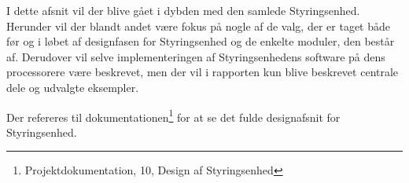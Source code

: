 
I dette afsnit vil der blive gået i dybden med den samlede Styringsenhed. Herunder vil der blandt andet være fokus på nogle af de valg, der er taget både før og i løbet af designfasen for Styringsenhed og de enkelte moduler, den består af. Derudover vil selve implementeringen af Styringsenhedens software på dens processorere være beskrevet, men der vil i rapporten kun blive beskrevet centrale dele og udvalgte eksempler.



Der refereres til dokumentationen\footnote{Projektdokumentation, 10, Design af Styringsenhed} for at se det fulde designafsnit for Styringsenhed.

